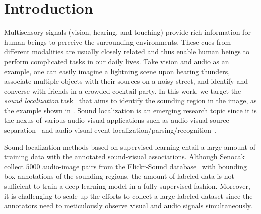 \vspace{-4mm}
\section{Introduction}\label{sec:intro}
\vspace{\secmargin}
Multisensory signals (\eg vision, hearing, and touching) provide rich information for human beings to perceive the surrounding environments.
%
These cues from different modalities are usually closely related and thus enable human beings to perform complicated tasks in our daily lives.
%
Take vision and audio as an example, one can easily imagine a lightning scene upon hearing thunders, associate multiple objects with their sources on a noisy street, and identify and converse with friends in a crowded cocktail party. 
%
In this work, we target the \emph{sound localization} task~\cite{av_nips20_loc,av_eccv20_mms_loc, av_cvpr18_lls,av_tpami20_lls} that aims to identify the sounding region in the image, as the example shown in .
% 
Sound localization is an emerging research topic since it is the nexus of various audio-visual applications such as audio-visual source separation~\cite{av_cvpr20_sep-gesture,av_eccv18_sep,co_sep_iccv19,av_iccv19_mpnet,sofm_iccv19,pix,av_iclr21_AudioScope,av_cvpr21_co_learning,av_cvpr21_gao2021VisualVoice,av_cvpr20_PreviewAudio} and audio-visual event localization/parsing/recognition~\cite{av_eccv20_avvp,eccv18_avel,av_iccv19_DAM,AVSDN,av_cvpr21_av_parsing,my_accv20_av-trans,av_iclr21_lee2021crossattentional}.



%
Sound localization methods based on supervised learning entail a large amount of training data with the annotated sound-visual associations.
%
Although Senocak~\etal~\cite{av_cvpr18_lls,av_tpami20_lls} collect $5000$ audio-image pairs from the Flickr-Sound database~\cite{av_nips16_soundnet} with bounding box annotations of the sounding regions, the amount of labeled data is not sufficient to train a deep learning model in a fully-supervised fashion.
% 
%
%
%
%
Moreover, it is challenging to scale up the efforts to collect a large labeled dataset since the annotators need to meticulously observe visual and audio signals simultaneously.

